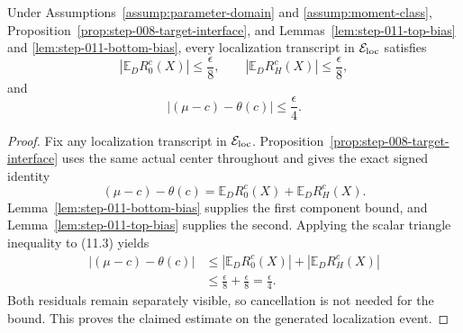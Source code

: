 \begin{proposition}\label{prop:step-011-bias-certificate}
Under Assumptions~\ref{assump:parameter-domain} and
\ref{assump:moment-class}, Proposition~\ref{prop:step-008-target-interface}, and
Lemmas~\ref{lem:step-011-top-bias} and
\ref{lem:step-011-bottom-bias}, every localization transcript in
\(\mathcal E_{\rm loc}\) satisfies
\[
\left|\mathbb E_D R_0^c(X)\right|\leq\frac\epsilon8,
\qquad
\left|\mathbb E_D R_H^c(X)\right|\leq\frac\epsilon8,
\]
and
\[
\boxed{
\left|(\mu-c)-\theta(c)\right|\leq\frac\epsilon4
}.
\]
\end{proposition}

\begin{proof}
Fix any localization transcript in
\(\mathcal E_{\rm loc}\). Proposition~\ref{prop:step-008-target-interface} uses the same actual
center throughout and gives the exact signed identity
\[
(\mu-c)-\theta(c)
=\mathbb E_D R_0^c(X)+\mathbb E_D R_H^c(X).
\tag{11.3}
\]
Lemma~\ref{lem:step-011-bottom-bias} supplies the first component bound,
and Lemma~\ref{lem:step-011-top-bias} supplies the second. Applying the
scalar triangle inequality to (11.3) yields
\[
\begin{aligned}
\left|(\mu-c)-\theta(c)\right|
&\leq\left|\mathbb E_D R_0^c(X)\right|
     +\left|\mathbb E_D R_H^c(X)\right|\\
&\leq\frac\epsilon8+\frac\epsilon8
=\frac\epsilon4.
\end{aligned}
\]
Both residuals remain separately visible, so cancellation is not needed for
the bound. This proves the claimed estimate on the generated localization
event.
\end{proof}

